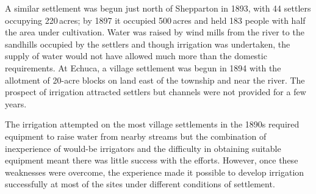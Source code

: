 A similar settlement was begun just north of Shepparton
 in 1893, with 44 settlers occupying 220\,acres;
by 1897 it occupied 500\,acres and held 183 people with half the area
under cultivation.  Water was raised by wind mills from the river to
the sandhills occupied by the settlers and though irrigation was
undertaken, the supply of water would not have allowed much more than
the domestic requirements.  At Echuca,  a village
settlement was begun in 1894 with the allotment of 20-acre blocks on
land east of the township and near the river.  The prospect of
irrigation attracted settlers but channels were not provided for a few
years.

\closure
The irrigation attempted on the most village settlements in the 1890s
required equipment to raise water from nearby streams but the
combination of inexperience of would-be irrigators and the difficulty
in obtaining suitable equipment meant there was little success with
the efforts.  However, once these weaknesses were overcome, the
experience made it possible to develop irrigation successfully at most
of the sites under different conditions of settlement.

